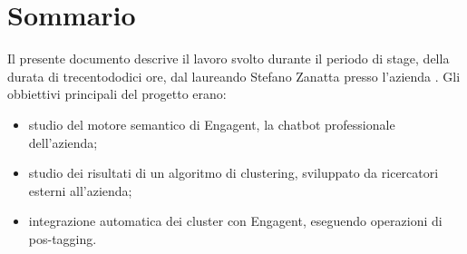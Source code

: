 
\cleardoublepage
{}
{}
\begingroup
\let\clearpage\relax
\let\cleardoublepage\relax
\let\cleardoublepage\relax

\chapter*{Sommario}

Il presente documento descrive il lavoro svolto durante il periodo di stage, della durata di trecentododici ore, dal laureando Stefano Zanatta presso l'azienda {\company}. Gli obbiettivi principali del progetto erano:
\begin{itemize}
    \item studio del motore semantico di Engagent, la chatbot professionale dell'azienda;
    \item studio dei risultati di un algoritmo di clustering, sviluppato da ricercatori esterni all'azienda;
    \item integrazione automatica dei cluster con Engagent, eseguendo operazioni di pos-tagging.
\end{itemize}

%
%

\endgroup			

\vfill

